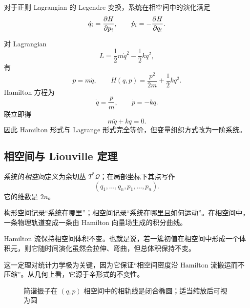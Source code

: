 \begin{theorem}
对于正则 Lagrangian 的 Legendre 变换，系统在相空间中的演化满足
\[
  \dot q_i = \pdv{H}{p_i},
  \qquad
  \dot p_i = -\pdv{H}{q_i}.
\]
\end{theorem}

\begin{example}
对 Lagrangian
\[
  L=\frac12 m\dot q^2-\frac12 kq^2,
\]
有
\[
  p=m\dot q,
  \qquad
  H(q,p)=\frac{p^2}{2m}+\frac12 kq^2.
\]
Hamilton 方程为
\[
  \dot q=\frac{p}{m},
  \qquad
  \dot p=-kq.
\]
联立即得
\[
  m\ddot q+kq=0.
\]
因此 Hamilton 形式与 Lagrange 形式完全等价，但变量组织方式改为一阶系统。
\end{example}

\subsection{相空间与 Liouville 定理}

\begin{definition}[相空间]
系统的\emph{相空间}定义为余切丛 $T^*\mathcal Q$；在局部坐标下其点写作
\[
  (q_1,\dots,q_n,p_1,\dots,p_n).
\]
它的维数是 $2n$。
\end{definition}

构形空间记录“系统在哪里”；相空间记录“系统在哪里且如何运动”。在相空间中，一条物理轨道变成一条由 Hamilton 向量场生成的积分曲线。

\begin{law}
Hamilton 流保持相空间体积不变。也就是说，若一簇初值在相空间中形成一个体积元，则它随时间演化虽然会拉伸、弯曲，但总体积保持不变。
\end{law}

这一定理对统计力学极为关键，因为它保证“相空间密度沿 Hamilton 流搬运而不压缩”。从几何上看，它源于辛形式的不变性。

\begin{figure}[htbp]
\centering
{}
\caption{简谐振子在 $(q,p)$ 相空间中的相轨线是闭合椭圆；适当缩放后可视为圆}
\end{figure}


